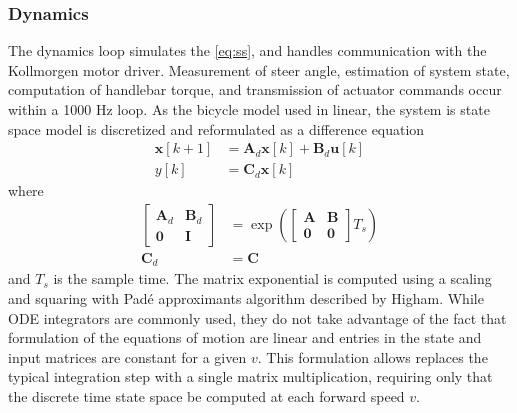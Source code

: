 \documentclass[11pt,a4paper,reqno]{amsart}
\newcommand{\state}{\bm{x}}
\newcommand{\sysInput}{\bm{u}}
\newcommand{\sysOutput}{y}
\newcommand{\stateMat}{\bm{A}}
\newcommand{\inputMat}{\bm{B}}
\newcommand{\outputMat}{\bm{C}}
\begin{document}
\subsubsection{Dynamics} \label{sec:imp_dyn}
The dynamics loop simulates the \autoref{eq:ss}, and handles communication with the Kollmorgen motor driver.
Measurement of steer angle, estimation of system state, computation of handlebar torque, and transmission of actuator
commands occur within a 1000 Hz loop.
As the bicycle model used in linear, the system is state space model is discretized and reformulated as a difference
equation
\begin{equation}
\begin{aligned}
    \state[k + 1] &= \stateMat_d \state[k] + \inputMat_d \sysInput[k] \\
    \sysOutput[k] &= \outputMat_d \state[k] \label{eq:dtss}
\end{aligned}
\end{equation}
where
\begin{equation}
\begin{aligned}
    \begin{bmatrix} \stateMat_d & \inputMat_d \\ \bm{0} & \bm{I} \end{bmatrix}
        &= \exp(\begin{bmatrix} \stateMat & \inputMat \\ \bm{0} & \bm{0} \end{bmatrix} T_s) \\
    \outputMat_d &= \outputMat \label{eq:c2d}
\end{aligned}
\end{equation}
and $ T_s $ is the sample time.
The matrix exponential is computed using a scaling and squaring with Pad{\'e} approximants algorithm described by
Higham\cite{higham2005}.
While ODE integrators are commonly used, they do not take advantage of the fact that formulation of the equations of
motion are linear and entries in the state and input matrices are constant for a given $ v $.
This formulation allows replaces the typical integration step with a single matrix multiplication, requiring only that
the discrete time state space be computed at each forward speed $ v $.
\end{document}
